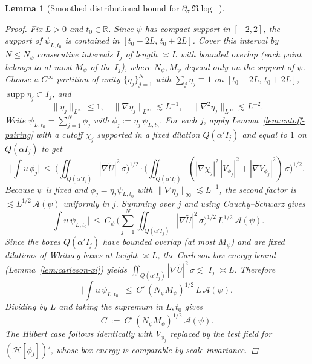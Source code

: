 \documentclass[11pt]{article}
\newtheorem{lemma}[theorem]{Lemma}
\theoremstyle{definition}
\theoremstyle{remark}
\newcommand{\R}{\mathbb{R}}
\DeclareMathOperator{\dettwo}{det_2}
\begin{document}
\begin{lemma}[Smoothed distributional bound for $\partial_\sigma\,\Re\log\dettwo$]
\begin{proof}
Fix $L>0$ and $t_0\in\R$. Since $\psi$ has compact support in $[-2,2]$, the support of $\psi_{L,t_0}$ is contained in $[t_0-2L,\,t_0+2L]$. Cover this interval by $N\le N_\psi$ consecutive intervals $I_j$ of length $\asymp L$ with bounded overlap (each point belongs to at most $M_\psi$ of the $I_j$), where $N_\psi,M_\psi$ depend only on the support of $\psi$. Choose a $C^\infty$ partition of unity $\{\eta_j\}_{j=1}^{N}$ with $\sum_j \eta_j\equiv 1$ on $[t_0-2L,\,t_0+2L]$, $\operatorname{supp}\eta_j\subset I_j$, and
\[\|\eta_j\|_{L^\infty}\le 1,\quad \|\nabla\eta_j\|_{L^\infty}\lesssim L^{-1},\quad \|\nabla^2\eta_j\|_{L^\infty}\lesssim L^{-2}.\]
Write $\psi_{L,t_0}=\sum_{j=1}^{N}\phi_j$ with $\phi_j:=\eta_j\,\psi_{L,t_0}$. For each $j$, apply Lemma~\ref{lem:cutoff-pairing} with a cutoff $\chi_j$ supported in a fixed dilation $Q(\alpha' I_j)$ and equal to $1$ on $Q(\alpha I_j)$ to get
\[
 \Big|\int u\,\phi_j\Big|\ \le\ \Big(\iint_{Q(\alpha' I_j)} |\nabla \widetilde U|^2\,\sigma\Big)^{1/2}
 \cdot \Big(\iint_{Q(\alpha' I_j)} (|\nabla\chi_j|^2\,|V_{\phi_j}|^2+|\nabla V_{\phi_j}|^2)\,\sigma\Big)^{1/2}.
\]
Because $\psi$ is fixed and $\phi_j=\eta_j\psi_{L,t_0}$ with $\|\nabla\eta_j\|_\infty\lesssim L^{-1}$, the second factor is $\lesssim L^{1/2}\,\mathcal A(\psi)$ uniformly in $j$. Summing over $j$ and using Cauchy--Schwarz gives
\[\Big|\int u\,\psi_{L,t_0}\Big|\ \le\ C_\psi\,\Big(\sum_{j=1}^N \iint_{Q(\alpha' I_j)} |\nabla \widetilde U|^2\,\sigma\Big)^{1/2}\,L^{1/2}\,\mathcal A(\psi).\]
Since the boxes $Q(\alpha' I_j)$ have bounded overlap (at most $M_\psi$) and are fixed dilations of Whitney boxes at height $\asymp L$, the Carleson box energy bound (Lemma~\ref{lem:carleson-xi}) yields $\iint_{Q(\alpha' I_j)} |\nabla \widetilde U|^2\,\sigma\lesssim |I_j|\asymp L$. Therefore
\[\Big|\int u\,\psi_{L,t_0}\Big|\ \le\ C'\,(N_\psi M_\psi)^{1/2}\,L\,\mathcal A(\psi).\]
Dividing by $L$ and taking the supremum in $L,t_0$ gives
\[ C\ :=\ C'\,(N_\psi M_\psi)^{1/2}\,\mathcal A(\psi). \]
The Hilbert case follows identically with $V_{\phi_j}$ replaced by the test field for $(\mathcal H[\phi_j])'$, whose box energy is comparable by scale invariance.
\end{proof}


\end{lemma}
\end{document}
